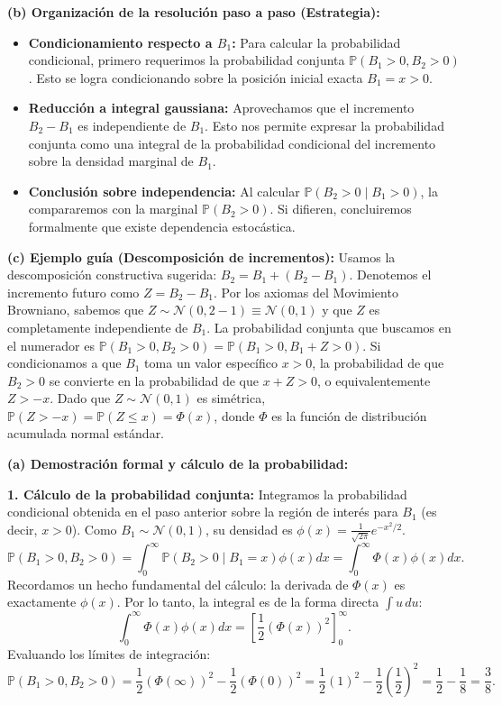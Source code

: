 \documentclass[11pt, letterpaper]{article}
\begin{document}
\begin{solucion}
    \textbf{(b) Organización de la resolución paso a paso (Estrategia):}
    \begin{itemize}
        \item[(i)] \textbf{Condicionamiento respecto a $B_1$:} Para calcular la probabilidad condicional, primero requerimos la probabilidad conjunta $\mathbb{P}(B_1 > 0, B_2 > 0)$. Esto se logra condicionando sobre la posición inicial exacta $B_1 = x > 0$.
        \item[(ii)] \textbf{Reducción a integral gaussiana:} Aprovechamos que el incremento $B_2 - B_1$ es independiente de $B_1$. Esto nos permite expresar la probabilidad conjunta como una integral de la probabilidad condicional del incremento sobre la densidad marginal de $B_1$.
        \item[(iii)] \textbf{Conclusión sobre independencia:} Al calcular $\mathbb{P}(B_2 > 0 \mid B_1 > 0)$, la compararemos con la marginal $\mathbb{P}(B_2 > 0)$. Si difieren, concluiremos formalmente que existe dependencia estocástica.
    \end{itemize}

    \vspace{3mm}
    \textbf{(c) Ejemplo guía (Descomposición de incrementos):}
    Usamos la descomposición constructiva sugerida: $B_2 = B_1 + (B_2 - B_1)$.
    Denotemos el incremento futuro como $Z = B_2 - B_1$. Por los axiomas del Movimiento Browniano, sabemos que $Z \sim \mathcal{N}(0, 2-1) \equiv \mathcal{N}(0, 1)$ y que $Z$ es completamente independiente de $B_1$.
    La probabilidad conjunta que buscamos en el numerador es $\mathbb{P}(B_1 > 0, B_2 > 0) = \mathbb{P}(B_1 > 0, B_1 + Z > 0)$.
    Si condicionamos a que $B_1$ toma un valor específico $x > 0$, la probabilidad de que $B_2 > 0$ se convierte en la probabilidad de que $x + Z > 0$, o equivalentemente $Z > -x$.
    Dado que $Z \sim \mathcal{N}(0,1)$ es simétrica, $\mathbb{P}(Z > -x) = \mathbb{P}(Z \le x) = \Phi(x)$, donde $\Phi$ es la función de distribución acumulada normal estándar.

    \vspace{3mm}
    \textbf{(a) Demostración formal y cálculo de la probabilidad:}

    \textbf{1. Cálculo de la probabilidad conjunta:}
    Integramos la probabilidad condicional obtenida en el paso anterior sobre la región de interés para $B_1$ (es decir, $x > 0$). Como $B_1 \sim \mathcal{N}(0,1)$, su densidad es $\phi(x) = \frac{1}{\sqrt{2\pi}}e^{-x^2/2}$.
    $$ \mathbb{P}(B_1 > 0, B_2 > 0) = \int_0^\infty \mathbb{P}(B_2 > 0 \mid B_1 = x) \phi(x) dx = \int_0^\infty \Phi(x) \phi(x) dx. $$
    Recordamos un hecho fundamental del cálculo: la derivada de $\Phi(x)$ es exactamente $\phi(x)$. Por lo tanto, la integral es de la forma directa $\int u \, du$:
    $$ \int_0^\infty \Phi(x) \phi(x) dx = \left[ \frac{1}{2} (\Phi(x))^2 \right]_0^\infty. $$
    Evaluando los límites de integración:
    $$ \mathbb{P}(B_1 > 0, B_2 > 0) = \frac{1}{2} (\Phi(\infty))^2 - \frac{1}{2} (\Phi(0))^2 = \frac{1}{2}(1)^2 - \frac{1}{2}\left(\frac{1}{2}\right)^2 = \frac{1}{2} - \frac{1}{8} = \frac{3}{8}. $$


\end{solucion}
\end{document}
